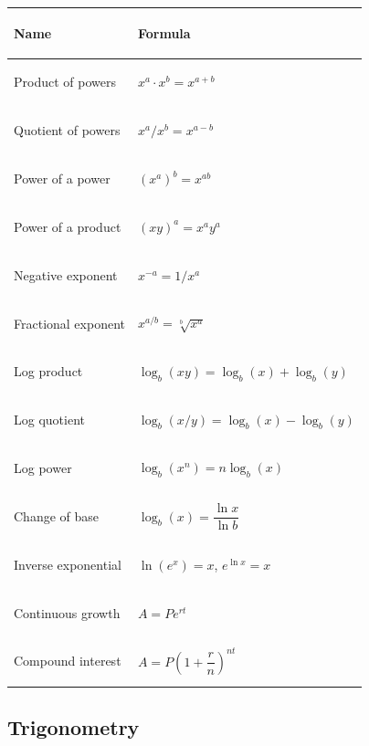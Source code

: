 \documentclass[11pt, letterpaper]{article}
\begin{document}
\noindent
{\small\renewcommand{\arraystretch}{1.6}
\begin{tabularx}{\textwidth}{>{\bfseries\raggedright\arraybackslash}p{4cm}
                              >{\raggedright\arraybackslash}X}
\toprule
\rowcolor{tableheaderpurple}
\textbf{Name} & \textbf{Formula} \\
\midrule
\rowcolor{rowPu} Product of powers        & $x^a \cdot x^b = x^{a+b}$ \\
\rowcolor{rowA}  Quotient of powers       & $x^a / x^b = x^{a-b}$ \\
\rowcolor{rowPu} Power of a power         & $(x^a)^b = x^{ab}$ \\
\rowcolor{rowA}  Power of a product       & $(xy)^a = x^a y^a$ \\
\rowcolor{rowPu} Negative exponent        & $x^{-a} = 1/x^a$ \\
\rowcolor{rowA}  Fractional exponent      & $x^{a/b} = \sqrt[b]{x^a}$ \\
\rowcolor{rowPu} Log product              & $\log_b(xy) = \log_b(x) + \log_b(y)$ \\
\rowcolor{rowA}  Log quotient             & $\log_b(x/y) = \log_b(x) - \log_b(y)$ \\
\rowcolor{rowPu} Log power                & $\log_b(x^n) = n \log_b(x)$ \\
\rowcolor{rowA}  Change of base           & $\log_b(x) = \dfrac{\ln x}{\ln b}$ \\
\rowcolor{rowPu} Inverse exponential      & $\ln(e^x) = x$, \; $e^{\ln x} = x$ \\
\rowcolor{rowA}  Continuous growth        & $A = P e^{rt}$ \\
\rowcolor{rowPu} Compound interest        & $A = P\!\left(1 + \dfrac{r}{n}\right)^{nt}$ \\
\bottomrule
\end{tabularx}}

\subsection*{Trigonometry}
\end{document}
